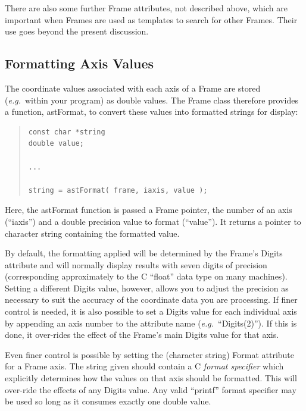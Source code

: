 \documentclass[twoside,11pt]{article}
\newcommand{\htmlref}[2]{#1}
\begin{document}
There are also some further Frame attributes, not described above,
which are important when Frames are used as templates to search for
other Frames. Their use goes beyond the present discussion.

\subsection{\label{ss:formattingaxisvalues}Formatting Axis Values}

The coordinate values associated with each axis of a \htmlref{Frame}{Frame} are stored
({\em{e.g.}}\ within your program) as double values. The Frame class
therefore provides a function, \htmlref{astFormat}{astFormat}, to convert these values into
formatted strings for display:

\begin{quote}
\small
\begin{verbatim}
const char *string
double value;

...

string = astFormat( frame, iaxis, value );
\end{verbatim}
\normalsize
\end{quote}

Here, the astFormat function is passed a Frame pointer, the number of
an axis (``iaxis'') and a double precision value to format
(``value''). It returns a pointer to character string containing the
formatted value.
\label{ss:formattingwithdigits}

By default, the formatting applied will be determined by the Frame's
Digits attribute and will normally display results with seven digits
of precision (corresponding approximately to the C ``float'' data type
on many machines). Setting a different Digits value, however, allows
you to adjust the precision as necessary to suit the accuracy of the
coordinate data you are processing.  If finer control is needed, it is
also possible to set a Digits value for each individual axis by
appending an axis number to the attribute name
({\em{e.g.}}\ ``Digits(2)''). If this is done, it over-rides the
effect of the Frame's main Digits value for that axis.

Even finer control is possible by setting the (character string)
Format attribute for a Frame axis. The string given should contain a C
{\em{format specifier}} which explicitly determines how the values on
that axis should be formatted. This will over-ride the effects of any
Digits value. Any valid ``printf'' format specifier may be used so
long as it consumes exactly one double value.
\end{document}

